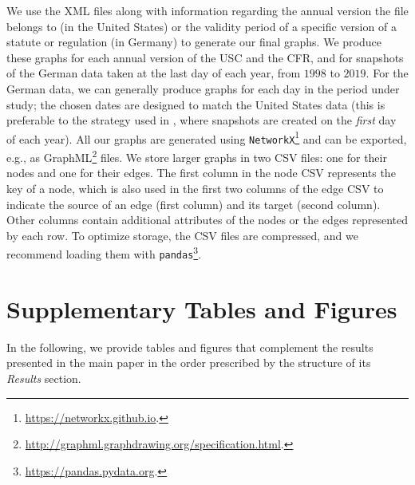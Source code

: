 \documentclass[utf8,sort&compress,numbers,square,table,hidelinks]{frontiers_suppmat} %
\begin{document}
We use the XML files along with information regarding the annual version the file belongs to (in the United States) 
or the validity period of a specific version of a statute or regulation (in Germany)
to generate our final graphs. 
We produce these graphs for each annual version of the USC and the CFR, 
and for snapshots of the German data taken at the last day of each year, 
from $1998$ to $2019$.
For the German data, we can generally produce graphs for each day in the period under study; 
the chosen dates are designed to match the United States data 
(this is preferable to the strategy used in \cite{katz2020}, where snapshots are created on the \emph{first} day of each year).
All our graphs are generated using \texttt{NetworkX}\footnote{\url{https://networkx.github.io}.} and can be exported, e.g.,
as GraphML\footnote{\url{http://graphml.graphdrawing.org/specification.html}.} files.  
We store larger graphs in two CSV files: one for their nodes and one for their edges. 
The first column in the node CSV represents the key of a node,
which is also used in the first two columns of the edge CSV to indicate the source of an edge (first column) and its target (second column). 
Other columns contain additional attributes of the nodes or the edges represented by each row. 
To optimize storage, the CSV files are compressed, 
and we recommend loading them with \texttt{pandas}\footnote{\url{https://pandas.pydata.org}.}.


\vspace*{6pt}
\section{Supplementary Tables and Figures}

In the following, we provide tables and figures that complement the results presented in the main paper in the order prescribed by the structure of its \emph{Results} section.
\end{document}
